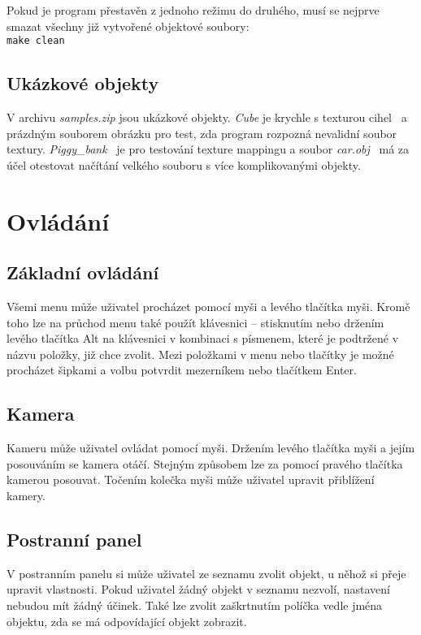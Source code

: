 \documentclass[a4paper, 11pt]{report}
\begin{document}
\begin{minipage}{\textwidth}
Pokud je program přestavěn z jednoho režimu do druhého, musí se nejprve smazat všechny již vytvořené objektové soubory:\\
\texttt{make clean}
\end{minipage}

\section{Ukázkové objekty}
V archivu \emph{samples.zip} jsou ukázkové objekty. \emph{Cube} je krychle s texturou cihel~\cite{sample:brick} a prázdným souborem obrázku pro test, zda program rozpozná nevalidní soubor textury. \emph{Piggy\_bank}~\cite{sample:piggy} je pro testování texture mappingu a soubor \emph{car.obj}~\cite{sample:car} má za účel otestovat načítání velkého souboru s více komplikovanými objekty.

\chapter{Ovládání}
\section{Základní ovládání}
Všemi menu může uživatel procházet pomocí myši a levého tlačítka myši. Kromě toho lze na průchod menu také použít klávesnici -- stisknutím nebo držením levého tlačítka Alt na klávesnici v kombinaci s písmenem, které je podtržené v názvu položky, již chce zvolit. Mezi položkami v menu nebo tlačítky je možné procházet šipkami a volbu potvrdit mezerníkem nebo tlačítkem Enter.

\section{\label{ovladaniKamery}Kamera}
Kameru může uživatel ovládat pomocí myši. Držením levého tlačítka myši a jejím posouváním se kamera otáčí. Stejným způsobem lze za pomocí pravého tlačítka kamerou posouvat. Točením kolečka myši může uživatel upravit přiblížení kamery.

\section{\label{panel}Postranní panel}
V postranním panelu si může uživatel ze seznamu zvolit objekt, u něhož si přeje upravit vlastnosti. Pokud uživatel žádný objekt v seznamu nezvolí, nastavení nebudou mít žádný účinek. Také lze zvolit zaškrtnutím políčka vedle jména objektu, zda se má odpovídající objekt zobrazit.
\end{document}
